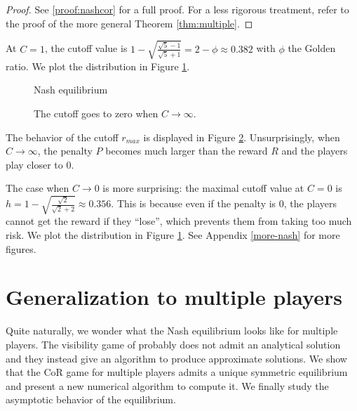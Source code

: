 \documentclass[preprint,12pt,authoryear,doubleblind]{elsarticle}
\theoremstyle{definition}
\begin{document}
\begin{proof}
    See \ref{proof:nashcor} for a full proof. For a less rigorous treatment, refer to the proof of the more general Theorem \ref{thm:multiple}.
\end{proof}

At $C = 1$, the cutoff value is $1 - \sqrt{\frac{\sqrt{5} - 1}{\sqrt{5} + 1}} = 2 - \phi \approx 0.382$ with $\phi$ the Golden ratio. We plot the distribution in Figure \ref{fig:nash}.


\begin{figure}[htbp]
  \centering
  \begin{minipage}[t]{0.48\textwidth}
    \centering
    
  \end{minipage}
  \hfill
  \begin{minipage}[t]{0.48\textwidth}
    \centering
    
  \end{minipage}
  \caption{Nash equilibrium}
  \label{fig:nash}  
\end{figure}


\begin{figure}[htbp]
  \centering
  
  \caption{The cutoff goes to zero when $C \rightarrow\infty$.}
  \label{fig:cutoff}  
\end{figure}


 The behavior of the cutoff ${r_{max}}$ is displayed in Figure \ref{fig:cutoff}. Unsurprisingly, when $C \rightarrow \infty$, the penalty $P$ becomes much larger than the reward $R$ and the players play closer to $0$.

The case when $C \rightarrow 0$ is more surprising: the maximal cutoff value at $C=0$ is $h = 1 - \sqrt{\frac{\sqrt{2}}{\sqrt{2} + 2}} \approx 0.356$. This is because even if the penalty is $0$, the players cannot get the reward if they ``lose'', which prevents them from taking too much risk. We plot the distribution in Figure \ref{fig:nash}. See Appendix \ref{more-nash} for more figures.


\section{Generalization to multiple players}

Quite naturally, we wonder what the Nash equilibrium looks like for multiple players. The visibility game of \citet{Lotker2008-tx} probably does not admit an analytical solution and they instead give an algorithm to produce approximate solutions. We show that the CoR game for multiple players admits a unique symmetric equilibrium and present a new numerical algorithm to compute it. We finally study the asymptotic behavior of the equilibrium. 
\end{document}
